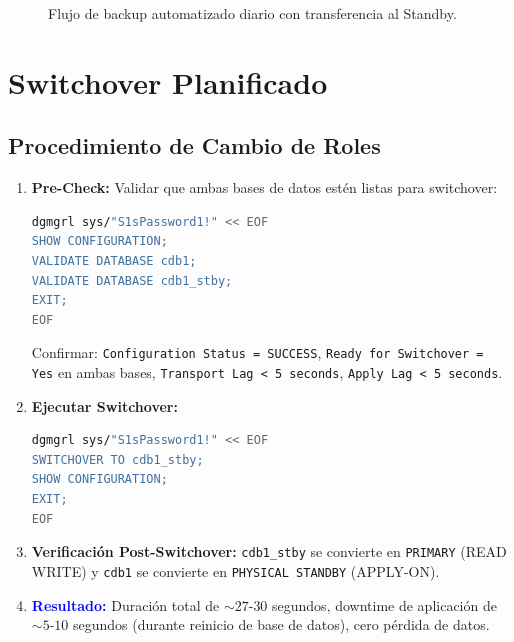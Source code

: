 \documentclass[11pt, a4paper]{report}
\newcommand{\destacado}[1]{\textbf{\textcolor{blue}{#1}}}
\begin{document}
\begin{figure}[H]
  \caption{Flujo de backup automatizado diario con transferencia al Standby.}
  \label{fig:backup_flow}
\end{figure}

\section{Switchover Planificado}

\subsection{Procedimiento de Cambio de Roles}
\begin{enumerate}
    \item \textbf{Pre-Check:} Validar que ambas bases de datos estén listas para switchover:
        \begin{lstlisting}[language=bash]
dgmgrl sys/"S1sPassword1!" << EOF
SHOW CONFIGURATION;
VALIDATE DATABASE cdb1;
VALIDATE DATABASE cdb1_stby;
EXIT;
EOF
\end{lstlisting}
        Confirmar: \texttt{Configuration Status = SUCCESS}, \texttt{Ready for Switchover = Yes} en ambas bases, \texttt{Transport Lag < 5 seconds}, \texttt{Apply Lag < 5 seconds}.
\item \textbf{Ejecutar Switchover:}
        \begin{lstlisting}[language=bash, caption={Comando de Switchover con DGMGRL}]
dgmgrl sys/"S1sPassword1!" << EOF
SWITCHOVER TO cdb1_stby;
SHOW CONFIGURATION;
EXIT;
EOF
\end{lstlisting}
    \item \textbf{Verificación Post-Switchover:} \texttt{cdb1\_stby} se convierte en \texttt{PRIMARY} (READ WRITE) y \texttt{cdb1} se convierte en \texttt{PHYSICAL STANDBY} (APPLY-ON).
\item \destacado{Resultado:} Duración total de $\sim 27$-$30$ segundos, downtime de aplicación de $\sim 5$-$10$ segundos (durante reinicio de base de datos), cero pérdida de datos.
\end{enumerate}
\end{document}
